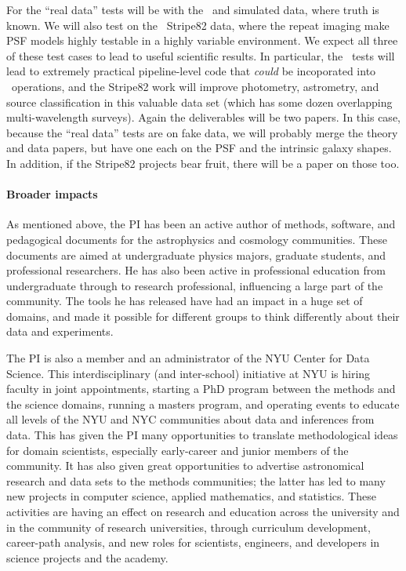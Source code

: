 \documentclass[12pt]{article}
\begin{document}
For  the ``real data'' tests will be with the
\lsst\ and  simulated data, where truth is known.  We
will also test on the \sdss\ Stripe82 data, where the repeat imaging
make PSF models highly testable in a highly variable environment.  We
expect all three of these test cases to lead to useful scientific
results.  In particular, the \lsst\ tests will lead to extremely
practical pipeline-level code that \emph{could} be incoporated into
\lsst\ operations, and the Stripe82 work will improve photometry,
astrometry, and source classification in this valuable data set (which
has some dozen overlapping multi-wavelength surveys).  Again the
deliverables will be two papers.  In this case, because the ``real
data'' tests are on fake data, we will probably merge the theory and
data papers, but have one each on the PSF and the intrinsic galaxy
shapes.  In addition, if the Stripe82 projects bear fruit, there will
be a paper on those too.

\paragraph{Broader impacts}

As mentioned above, the PI has been an active author of methods,
software, and pedagogical documents for the astrophysics and cosmology
communities.
These documents are aimed at undergraduate physics majors, graduate
students, and professional researchers.
He has also been active in professional education from undergraduate
through to research professional, influencing a large part of the
community.
The tools he has released have had an impact in a huge set of domains,
and made it possible for different groups to think differently about
their data and experiments.

The PI is also a member and an administrator of the NYU Center for
Data Science.
This interdisciplinary (and inter-school) initiative at NYU is hiring
faculty in joint appointments, starting a PhD program between the
methods and the science domains, running a masters program, and
operating events to educate all levels of the NYU and NYC communities
about data and inferences from data.
This has given the PI many opportunities to translate methodological
ideas for domain scientists, especially early-career and junior
members of the community.
It has also given great opportunities to advertise astronomical
research and data sets to the methods communities; the latter has led
to many new projects in computer science, applied mathematics, and
statistics.
These activities are having an effect on research and education across
the university and in the community of research universities, through
curriculum development, career-path analysis, and new roles for
scientists, engineers, and developers in science projects and the
academy.
\end{document}
